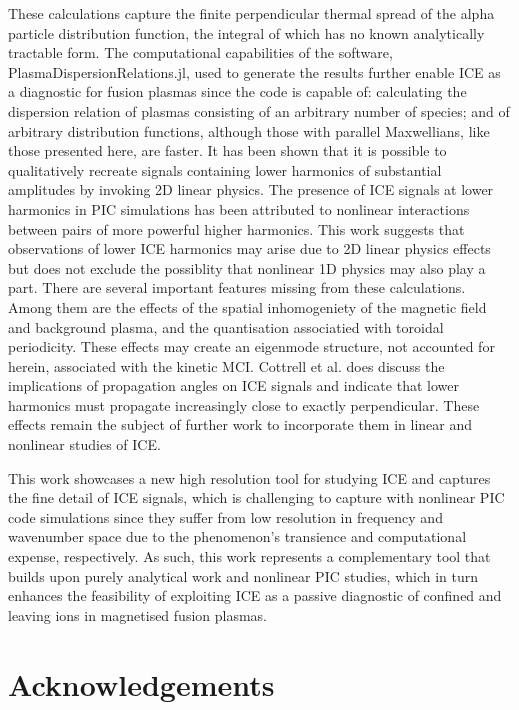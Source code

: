 \documentclass[12pt]{iopart}
\begin{document}
These calculations capture the finite perpendicular thermal spread of the alpha
particle distribution function, the integral of which has no known analytically
tractable form. The computational capabilities of the software,
PlasmaDispersionRelations.jl, used to generate the results further enable ICE as
a diagnostic for fusion plasmas since the code is capable of: calculating the
dispersion relation of plasmas consisting of an arbitrary number of species; and
of arbitrary distribution functions, although those with parallel Maxwellians,
like those presented here, are faster. It has been shown that it is possible to
qualitatively recreate signals containing lower harmonics of substantial amplitudes by
invoking 2D linear physics. The presence of ICE signals at lower harmonics in
PIC simulations has been attributed to nonlinear interactions between pairs of
more powerful higher harmonics\cite{Carbajal2014}. This work suggests that
observations of lower ICE harmonics may arise due to 2D
linear physics effects but does not exclude the possiblity that nonlinear 1D
physics\cite{Chapman2018} may also play a part.
There are several important features missing from these calculations. Among them
are the effects of the spatial inhomogeniety of the magnetic field and background
plasma, and the quantisation associatied with toroidal periodicity. These
effects may create an eigenmode structure, not accounted for herein,
associated with the kinetic MCI.
Cottrell et al. \cite{Cottrell1993} does discuss the implications of propagation
angles on ICE signals and indicate that lower harmonics must propagate
increasingly close to exactly perpendicular. These effects remain the subject of
further work to incorporate them in linear and nonlinear studies of ICE.

This work showcases a new high resolution tool for studying ICE and captures the
fine detail of ICE signals, which is challenging to capture with nonlinear PIC
code simulations since they suffer from low resolution in frequency and
wavenumber space due to the phenomenon's transience and computational expense,
respectively. As such, this work represents a complementary tool that builds
upon purely analytical work and nonlinear PIC studies, which in turn enhances
the feasibility of exploiting ICE as a passive diagnostic of confined and
leaving ions in magnetised fusion plasmas.

\section{Acknowledgements}
\end{document}

